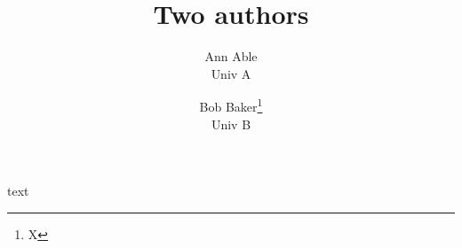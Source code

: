 \documentclass{article}
\begin{document}
\title{Two authors}
\author{Ann Able \\ Univ A \and Bob Baker\footnote{X} \\ Univ B}
\date{}
\maketitle
text
\end{document}
